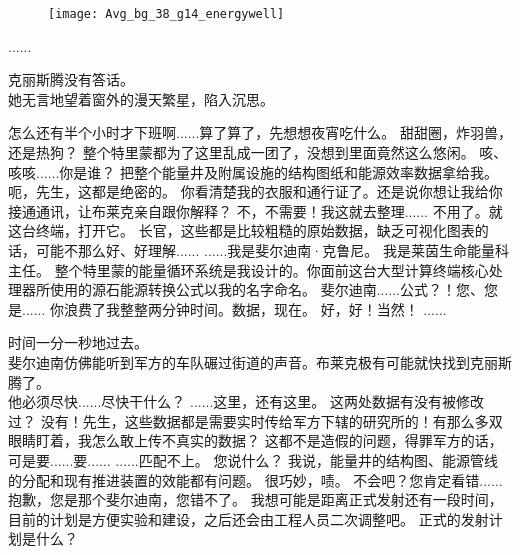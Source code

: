 \documentclass[openany]{book}
\begin{document}
\begin{figure}[h]
    \centering
    \texttt{[image: Avg\_bg\_38\_g14\_energywell]}
\end{figure}
\begin{dialogue}
     ......\par
    克丽斯腾没有答话。\\
    她无言地望着窗外的漫天繁星，陷入沉思。
\end{dialogue}

\begin{dialogue}
     怎么还有半个小时才下班啊......算了算了，先想想夜宵吃什么。
     甜甜圈，炸羽兽，还是热狗？
     整个特里蒙都为了这里乱成一团了，没想到里面竟然这么悠闲。
     咳、咳咳......你是谁？
     把整个能量井及附属设施的结构图纸和能源效率数据拿给我。
     呃，先生，这都是绝密的。
     你看清楚我的衣服和通行证了。还是说你想让我给你接通通讯，让布莱克亲自跟你解释？
     不，不需要！我这就去整理......
     不用了。就这台终端，打开它。
     长官，这些都是比较粗糙的原始数据，缺乏可视化图表的话，可能不那么好、好理解......
     ......我是斐尔迪南·克鲁尼。
     我是莱茵生命能量科主任。
     整个特里蒙的能量循环系统是我设计的。你面前这台大型计算终端核心处理器所使用的源石能源转换公式以我的名字命名。
     斐尔迪南......公式？！您、您是......
     你浪费了我整整两分钟时间。数据，现在。
     好，好！当然！
     ......\par
    时间一分一秒地过去。\\
    斐尔迪南仿佛能听到军方的车队碾过街道的声音。布莱克极有可能就快找到克丽斯腾了。\\
    他必须尽快......尽快干什么？
     ......这里，还有这里。
     这两处数据有没有被修改过？
     没有！先生，这些数据都是需要实时传给军方下辖的研究所的！有那么多双眼睛盯着，我怎么敢上传不真实的数据？
     这都不是造假的问题，得罪军方的话，可是要......要......
     ......匹配不上。
     您说什么？
     我说，能量井的结构图、能源管线的分配和现有推进装置的效能都有问题。
     很巧妙，啧。
     不会吧？您肯定看错......抱歉，您是那个斐尔迪南，您错不了。
     我想可能是距离正式发射还有一段时间，目前的计划是方便实验和建设，之后还会由工程人员二次调整吧。
     正式的发射计划是什么？

\end{dialogue}
\end{document}

